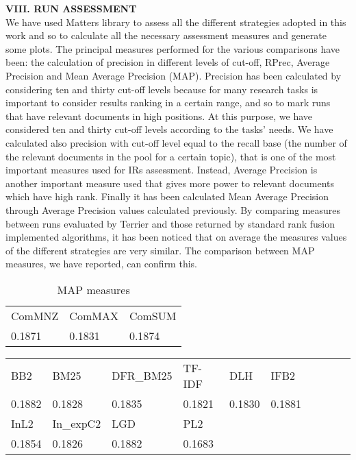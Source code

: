 \documentclass[12pt,journal]{IEEEtran}
\begin{document}
\textbf{VIII.	RUN ASSESSMENT} \\
We have used Matters library to assess all the different strategies adopted in this work and so to calculate all the necessary assessment measures and generate some plots.
The principal measures performed for the various comparisons have been: the calculation of precision in different levels of cut-off, RPrec, Average Precision and Mean Average Precision (MAP).
Precision has been calculated by considering ten and thirty cut-off levels because for many research tasks is important to consider results ranking in a certain range, and so to mark runs that have relevant documents in high positions. At this purpose, we have considered ten and thirty cut-off levels according to the tasks' needs. We have calculated also precision with cut-off level equal to the recall base (the number of the relevant documents in the pool for a certain topic), that is one of the most important measures used for IRs assessment.
Instead, Average Precision is another important measure used that gives more power to relevant documents which have high rank.
Finally it has been calculated Mean Average Precision through Average Precision values calculated previously.
By comparing measures between runs evaluated by Terrier and those returned by standard rank fusion implemented algorithms, it has been noticed that on average the measures values of the different strategies are very similar. The comparison between MAP measures, we have reported, can confirm this. \\

\begin{table}[h!]
\centering
\caption{MAP measures}
\begin{tabular}{|l|l|l|}
\hline
ComMNZ & ComMAX & ComSUM \\
0.1871 & 0.1831 & 0.1874 \\ \hline
\end{tabular}
\end{table}

\begin{table}[h!]
\centering
\begin{tabular}{|l|l|l|l|l|l|l|l|l|l|}
\hline
BB2    & BM25   & DFR\_BM25 & TF-IDF & DLH & IFB2     \\
0.1882 & 0.1828 & 0.1835    & 0.1821 & 0.1830 & 0.1881 \\ \hline
InL2   & In\_expC2 & LGD    & PL2    &        &       \\
0.1854 & 0.1826    & 0.1882 & 0.1683 &        & \\ \hline
\end{tabular}
\end{table}
\end{document}

